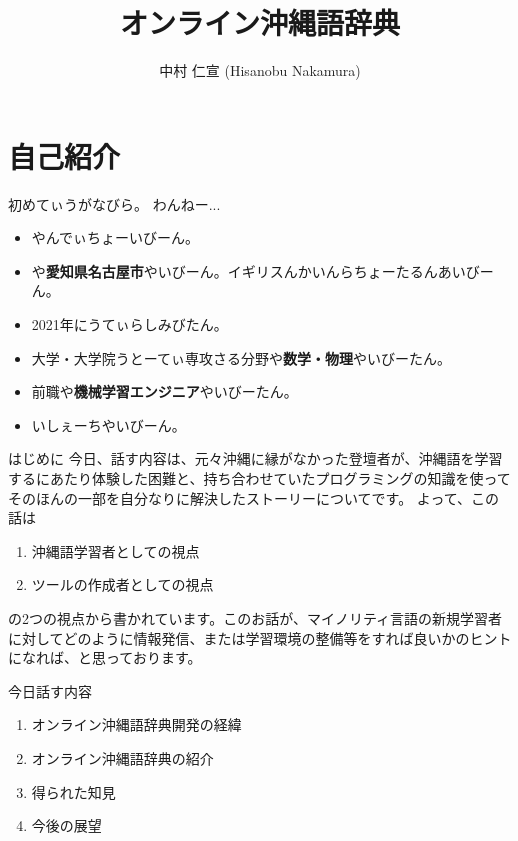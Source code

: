 \documentclass[14pt]{beamer}
\title{オンライン沖縄語辞典}
\author{中村 仁宣 (Hisanobu Nakamura)}
\begin{document}
\begin{frame}
  \maketitle  
\end{frame}

\section{自己紹介}

\begin{frame}{初めてぃうがなびら。}
  わんねー...
    \begin{itemize}
    \item {}や\textbf{}んでぃちょーいびーん。
    \item {}や\textbf{愛知県名古屋市}やいびーん。イギリスんかいんらちょーたるんあいびーん。
    \item 2021年にうてぃらしみびたん。
    \item 大学・大学院うとーてぃ専攻さる分野や\textbf{数学・物理}やいびーたん。
    \item 前職や\textbf{機械学習エンジニア}やいびーたん。
    \item {}いしぇーちやいびーん。
    \end{itemize}
\end{frame}

\begin{frame}{はじめに}
  今日、話す内容は、元々沖縄に縁がなかった登壇者が、沖縄語を学習するにあたり体験した困難と、持ち合わせていたプログラミングの知識を使ってそのほんの一部を自分なりに解決したストーリーについてです。
  よって、この話は
  \begin{enumerate}
  \item {}沖縄語学習者としての視点
  \item ツールの作成者としての視点
  \end{enumerate}
  の2つの視点から書かれています。このお話が、マイノリティ言語の新規学習者に対してどのように情報発信、または学習環境の整備等をすれば良いかのヒントになれば、と思っております。
\end{frame}

\begin{frame}{今日話す内容}
  \begin{enumerate}
  \item オンライン沖縄語辞典開発の経緯
  \item オンライン沖縄語辞典の紹介
  \item 得られた知見
  \item 今後の展望
  \end{enumerate}
\end{frame}
\end{document}
